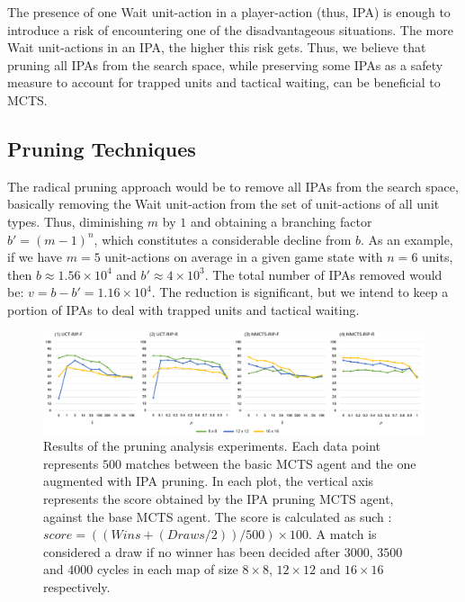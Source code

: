 \documentclass[conference]{IEEEtran}
\begin{document}
The presence of one Wait unit-action in a player-action (thus, IPA) is enough to introduce a risk of encountering one of the disadvantageous situations. The more Wait unit-actions in an IPA, the higher this risk gets. Thus, we believe that pruning all IPAs from the search space, while preserving some IPAs as a safety measure to account for trapped units and tactical waiting, can be beneficial to MCTS.



\subsection{Pruning Techniques}

The radical pruning approach would be to remove all IPAs from the search space, basically removing the Wait unit-action from the set of unit-actions of all unit types. Thus, diminishing $m$ by $1$ and obtaining a branching factor $b' = (m - 1)^n$, which constitutes a considerable decline from $b$. As an example, if we have $m=5$ unit-actions on average in a given game state with $n=6$ units, then $b \approx 1.56\times10^4$ and $b' \approx 4\times10^3$. The total number of IPAs removed would be: $v = b - b' = 1.16\times10^4$. The reduction is significant, but we intend to keep a portion of IPAs to deal with trapped units and tactical waiting.

\begin{figure}[!h]
\begin{center}
	\includegraphics[width=1\textwidth]{figs/PT-h.pdf}
	\caption{Results of the pruning analysis experiments. Each data point represents $500$ matches between the basic MCTS agent and the one augmented with IPA pruning. In each plot, the vertical axis represents the score obtained by the IPA pruning MCTS agent, against the base MCTS agent. The score is calculated as such : $score = ((Wins + (Draws / 2)) / 500) \times 100$. A match is considered a draw if no winner has been decided after $3000$, $3500$ and $4000$ cycles in each map of size $8\times8$, $12\times12$ and $16\times16$ respectively.}
	\label{PruningAnalysis}
\end{center}
\end{figure}
\end{document}
